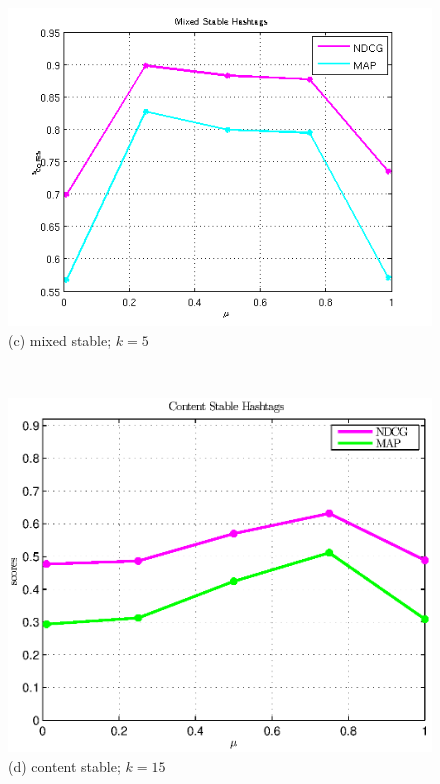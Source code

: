 \begin{figure}[!t]
\begin{minipage}{0.310\linewidth}
  \includegraphics[width=1\textwidth]{KDD/images/mixed}             
  (c) mixed stable; $k = 5$
\end{minipage} \\
\begin{minipage}{0.310\linewidth}
  \centering
  \includegraphics[width=1\textwidth]{KDD/images/content_t_15}             
   (d) content stable; $k = 15$
\end{minipage}
\begin{minipage}{0.310\linewidth}
  \centering

\end{minipage}
\end{figure}
